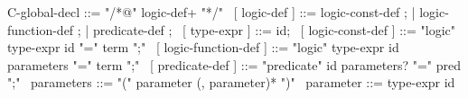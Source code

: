 \begin{syntax}
  C-global-decl ::= "/*@" logic-def+ "*/"
  \
  [ logic-def ] ::= logic-const-def ;
          | logic-function-def ;
          | predicate-def ;
  \
  [ type-expr ] ::= id;
  \
  [ logic-const-def ] ::= "logic" type-expr id "=" term ";"
  \
  [ logic-function-def ] ::= "logic" type-expr id parameters "=" term ";"
  \
  [ predicate-def ] ::= "predicate" id parameters? "=" pred ";"
  \
  parameters ::= "(" parameter (, parameter)* ")"
  \
  parameter ::= type-expr id
\end{syntax}
